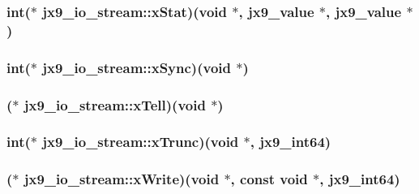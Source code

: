 \hypertarget{structjx9__io__stream_a21e84bf7eff6b38ea9a87ab575acb77b}{
\subsubsection[{x\-Stat}]{\setlength{\rightskip}{0pt plus 5cm}int($\ast$ jx9\-\_\-io\-\_\-stream\-::x\-Stat)(void $\ast$, {\bf jx9\-\_\-value} $\ast$, {\bf jx9\-\_\-value} $\ast$)}}\label{d0/d90/structjx9__io__stream_a21e84bf7eff6b38ea9a87ab575acb77b}
\hypertarget{structjx9__io__stream_aa150d524652a28b07d001153154aac0f}{
\subsubsection[{x\-Sync}]{\setlength{\rightskip}{0pt plus 5cm}int($\ast$ jx9\-\_\-io\-\_\-stream\-::x\-Sync)(void $\ast$)}}\label{d0/d90/structjx9__io__stream_aa150d524652a28b07d001153154aac0f}
\hypertarget{structjx9__io__stream_ab7733b807f15d82b170799439a203c5f}{
\subsubsection[{x\-Tell}]{($\ast$ jx9\-\_\-io\-\_\-stream\-::x\-Tell)(void $\ast$)}}\label{d0/d90/structjx9__io__stream_ab7733b807f15d82b170799439a203c5f}
\hypertarget{structjx9__io__stream_ad8580da931139bbe35bf97953ddf173e}{
\subsubsection[{x\-Trunc}]{\setlength{\rightskip}{0pt plus 5cm}int($\ast$ jx9\-\_\-io\-\_\-stream\-::x\-Trunc)(void $\ast$, {\bf jx9\-\_\-int64})}}\label{d0/d90/structjx9__io__stream_ad8580da931139bbe35bf97953ddf173e}
\hypertarget{structjx9__io__stream_a97a9de1f1f259a9fba9805d17744b6df}{
\subsubsection[{x\-Write}]{($\ast$ jx9\-\_\-io\-\_\-stream\-::x\-Write)(void $\ast$, const void $\ast$, {\bf jx9\-\_\-int64})}}\label{d0/d90/structjx9__io__stream_a97a9de1f1f259a9fba9805d17744b6df}
